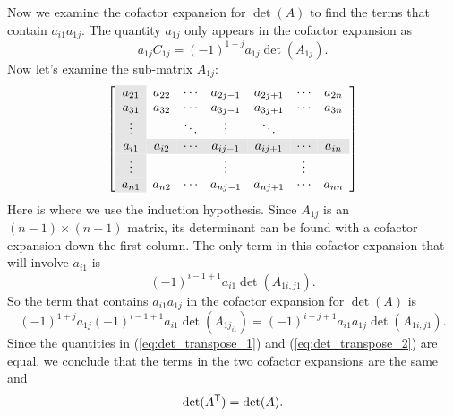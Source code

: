 Now we examine the cofactor expansion for $\det(A)$ to find the terms that contain $a_{i1}a_{1j}$. The quantity $a_{1j}$ only appears in the cofactor expansion as 
\[a_{1j}C_{1j} = (-1)^{1+j}a_{1j}\det(A_{1j}).\]
Now let's examine the sub-matrix $A_{1j}$: 
\[\left[ \begin{array}{>{\columncolor{Gray}}ccccccc}
a_{21} 	& a_{22} 	& \cdots    &a_{2j-1} &a_{2j+1} &\cdots & a_{2n} \\
a_{31} 	& a_{32} 	& \cdots    &a_{3j-1} &a_{3j+1} &\cdots & a_{3n} \\
\vdots 	&       		& \ddots    & \vdots   &\ddots 	 & 		 & \\
\rowcolor{Gray}
a_{i1} 	& a_{i2} 	& \cdots     &a_{ij-1} &a_{ij+1}   &\cdots & a_{in} \\
\vdots 	&       		&          	& \vdots   & 			  &\vdots &\\
a_{n1} 	& a_{n2} 	& \cdots    &a_{nj-1} &a_{nj+1}  &\cdots & a_{nn}
\end{array} \right] \]
Here is where we use the induction hypothesis. Since $A_{1j}$ is an $(n-1) \times (n-1)$ matrix, its determinant can be found with a cofactor expansion down the first column. The only term in this cofactor expansion that will involve $a_{i1}$ is 
\[(-1)^{i-1+1}a_{i1} \det(A_{1i, j1}).\]
So the term that contains $a_{i1}a_{1j}$ in the cofactor expansion for $\det(A)$ is 
\begin{equation} \label{eq:det_transpose_2}
(-1)^{1+j}a_{1j}(-1)^{i-1+1}a_{i1} \det(A_{1j_{i1}}) = (-1)^{i+j+1} a_{i1}a_{1j}\det(A_{1i, j1}).
\end{equation}
Since the quantities in (\ref{eq:det_transpose_1}) and (\ref{eq:det_transpose_2}) are equal, we conclude that the terms in the two cofactor expansions are the same and 
\[\det(A^{\mathsf{T}}) = \det(A).\]


